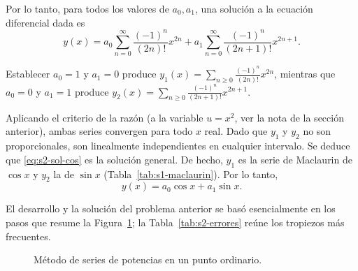 \begin{example}
Por lo tanto, para todos los valores de $a_0, a_1$, una solución a la ecuación diferencial dada es
\begin{equation}
y(x) = a_0 \sum_{n=0}^{\infty} \frac{(-1)^n}{(2n)!}x^{2n} + a_1 \sum_{n=0}^{\infty} \frac{(-1)^n}{(2n+1)!}x^{2n+1}.
\label{eq:s2-sol-cos}
\end{equation}
 
Establecer $a_0 = 1$ y $a_1 = 0$ produce $y_1(x) = \sum_{n\ge 0} \frac{(-1)^n}{(2n)!}x^{2n}$, mientras que $a_0 = 0$ y $a_1 = 1$ produce $y_2(x) = \sum_{n\ge 0} \frac{(-1)^n}{(2n+1)!}x^{2n+1}$.
 
Aplicando el criterio de la razón (a la variable $u=x^2$, ver la nota de la sección anterior), ambas series convergen para todo $x$ real. Dado que $y_1$ y $y_2$ no son proporcionales, son linealmente independientes en cualquier intervalo. Se deduce que \eqref{eq:s2-sol-cos} es la solución general. De hecho, $y_1$ es la serie de Maclaurin de $\cos x$ y $y_2$ la de $\sin x$ (Tabla~\ref{tab:s1-maclaurin}). Por lo tanto,
\[ y(x) = a_0 \cos x + a_1 \sin x. \tag*{$\square$} \]
\end{example}
 
El desarrollo y la solución del problema anterior se basó esencialmente en los pasos que resume la Figura~\ref{fig:s2-metodo}; la Tabla~\ref{tab:s2-errores} reúne los tropiezos más frecuentes.
 
\begin{figure}[H]
\centering
{}
\caption{Método de series de potencias en un punto ordinario.}
\label{fig:s2-metodo}
\end{figure}
 
